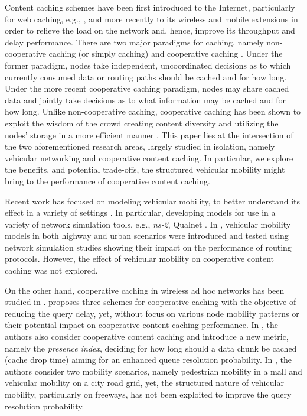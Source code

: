 \documentclass[conference,a4paper]{IEEEtran}
\begin{document}
Content caching schemes have been first introduced to the Internet, particularly for web caching, e.g., \cite{wang1999survey,Barish:2000www}, and more recently to its wireless and mobile extensions \cite{Niesen:2009ws} in order to relieve the load on the network and, hence, improve its throughput and delay performance. There are two major paradigms for caching, namely non-cooperative caching (or simply caching) \cite{Cao:2002pro} and cooperative caching \cite{Jing:2010coo}. Under the former paradigm, nodes take independent, uncoordinated decisions as to which currently consumed data or routing paths should be cached and for how long. Under the more recent cooperative caching paradigm, nodes may share cached data and jointly take decisions as to what information may be cached and for how long. Unlike non-cooperative caching, cooperative caching has been shown to exploit the wisdom of the crowd creating content diversity and utilizing the nodes' storage in a more efficient manner \cite{sailhan:2003cooperative}. This paper lies at the intersection of the two aforementioned research areas, largely studied in isolation, namely vehicular networking and cooperative content caching. In particular, we explore the benefits, and potential trade-offs, the structured vehicular mobility might bring to the performance of cooperative content caching.

Recent work has focused on modeling vehicular mobility, to better understand its effect in a variety of settings \cite{Saha:2004mmv,Fiore:2007wq,Durrani:vx,Sommer:2008wz}. In particular, developing models for use in a variety of network simulation tools, e.g., {\it ns-2}, Qualnet \cite{Hadi:2010uz,Mahajan:2006tx,Harri:2006:VGR}. In \cite{Fiore:2007wq}, vehicular mobility models in both highway and urban scenarios were introduced and tested using network simulation studies showing their impact on the performance of routing protocols. However, the effect of vehicular mobility on cooperative content caching was not explored.

On the other hand, cooperative caching in wireless ad hoc networks has been studied in \cite{Yin:2004we,Fiore:2009vf}. \cite{Yin:2004we} proposes three schemes for cooperative caching with the objective of reducing the query delay, yet, without focus on various node mobility patterns or their potential impact on cooperative content caching performance. In \cite{Fiore:2009vf}, the authors also consider cooperative content caching and introduce a new metric, namely the {\it presence index}, deciding for how long should a data chunk be cached (cache drop time) aiming for an enhanced queue resolution probability. In \cite{Fiore:2009vf}, the authors consider two mobility scenarios, namely pedestrian mobility in a mall and vehicular mobility on a city road grid, yet, the structured nature of vehicular mobility, particularly on freeways, has not been exploited to improve the query resolution probability.
\end{document}
